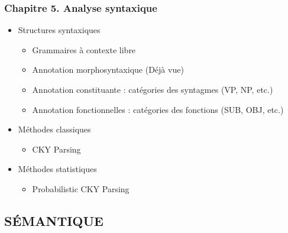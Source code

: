 \documentclass[11pt, a4paper]{article}
\begin{document}
\begin{tcolorbox}
\subsubsection*{Chapitre 5. Analyse syntaxique}

\begin{multicols}{2}
	\begin{itemize}
		
		\item Structures syntaxiques
		\begin{itemize}
			\item Grammaires à contexte libre
			\item Annotation morphosyntaxique (Déjà vue)
			\item Annotation constituante : catégories des syntagmes (VP, NP, etc.)
			\item Annotation fonctionnelles : catégories des fonctions (SUB, OBJ, etc.)
		\end{itemize}
		
		\item Méthodes classiques
		\begin{itemize}
			\item CKY Parsing
		\end{itemize}
	
		\item Méthodes statistiques
		\begin{itemize}
			\item Probabilistic CKY Parsing
		\end{itemize}
		
	\end{itemize}
\end{multicols}
\end{tcolorbox}

\subsection*{\uppercase{Sémantique}}
\end{document}
